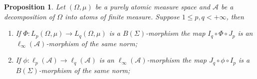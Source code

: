 \documentclass[12pt]{article}
\newtheorem{proposition}[theorem]{Proposition}
\begin{document}
\begin{proposition}\label{SwtchMorphBtwnAtomMeasSp}
    Let $(\Omega,\mu)$ be a purely atomic measure space and $\mathcal{A}$ be 
    a decomposition of $\Omega$ into atoms of finite measure. 
    Suppose $1\leq p,q<+\infty$, then
    \begin{enumerate}[label = (\roman*)]
        \item If $\Phi:L_p(\Omega,\mu)\to L_q(\Omega,\mu)$ is 
        a $B(\Sigma)$-morphism the map $I_q\circ \Phi\circ J_p$ is 
        an $\ell_\infty(\mathcal{A})$-morphism of the same norm;

        \item If $\phi:\ell_p(\mathcal{A})\to \ell_q(\mathcal{A})$ is 
        an $\ell_\infty(\mathcal{A})$-morphism the
        map $J_q\circ \phi\circ I_p$ is a $B(\Sigma)$-morphism of the same norm;
    \end{enumerate} 
    
\end{proposition}
\end{document}
